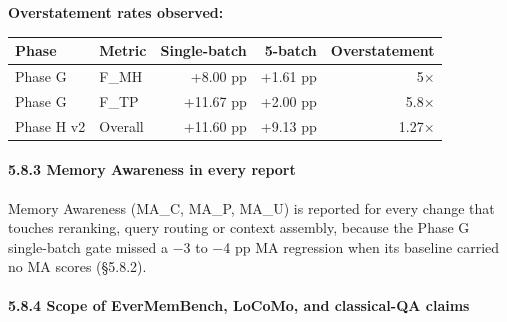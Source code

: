 \documentclass[
]{article}
\newcounter{none} %
\begin{document}
\textbf{Overstatement rates observed:}

{\def\LTcaptype{none} %
\begin{longtable}[]{@{}llrrr@{}}
\toprule\noalign{}
Phase & Metric & Single-batch & 5-batch & Overstatement \\
\midrule\noalign{}
\endhead
\bottomrule\noalign{}
\endlastfoot
Phase G & F\_MH & +8.00 pp & +1.61 pp & 5× \\
Phase G & F\_TP & +11.67 pp & +2.00 pp & 5.8× \\
Phase H v2 & Overall & +11.60 pp & +9.13 pp & 1.27× \\
\end{longtable}
}

\paragraph{5.8.3 Memory Awareness in every
report}\label{memory-awareness-in-every-report}

Memory Awareness (MA\_C, MA\_P, MA\_U) is reported for every change that
touches reranking, query routing or context assembly, because the Phase
G single-batch gate missed a −3 to −4 pp MA regression when its baseline
carried no MA scores (§5.8.2).

\paragraph{5.8.4 Scope of EverMemBench, LoCoMo, and classical-QA
claims}\label{scope-of-evermembench-locomo-and-classical-qa-claims}
\end{document}
